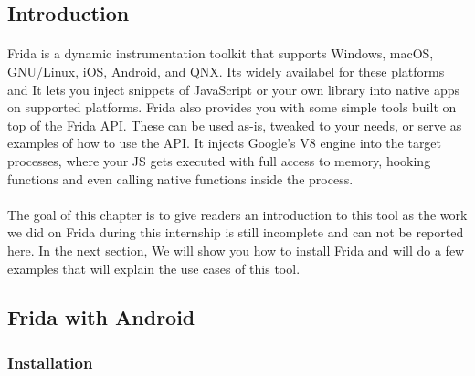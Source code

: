 \documentclass[../main.tex]{subfile}
\begin{document}
	\subsection{Introduction}
	\paragraph{}  Frida is a dynamic instrumentation toolkit that supports  Windows, macOS, GNU/Linux, iOS, Android, and QNX. Its widely availabel for these platforms and It lets you inject snippets of JavaScript or your own library into native apps on supported platforms. Frida also provides you with some simple tools built on top of the Frida API. These can be used as-is, tweaked to your needs, or serve as examples of how to use the API. It injects Google’s V8 engine into the target processes, where your JS gets executed with full access to memory, hooking functions and even calling native functions inside the process. \cite{frida}
	\paragraph{} The goal of this chapter is to give readers an introduction to this tool as the work we did on Frida during this internship is still incomplete and can not be reported here. In the next section, We will show you how to install Frida and will do a few examples that will explain the use cases of this tool.
	\subsection{Frida with Android}
	\subsubsection{Installation}
\end{document}
